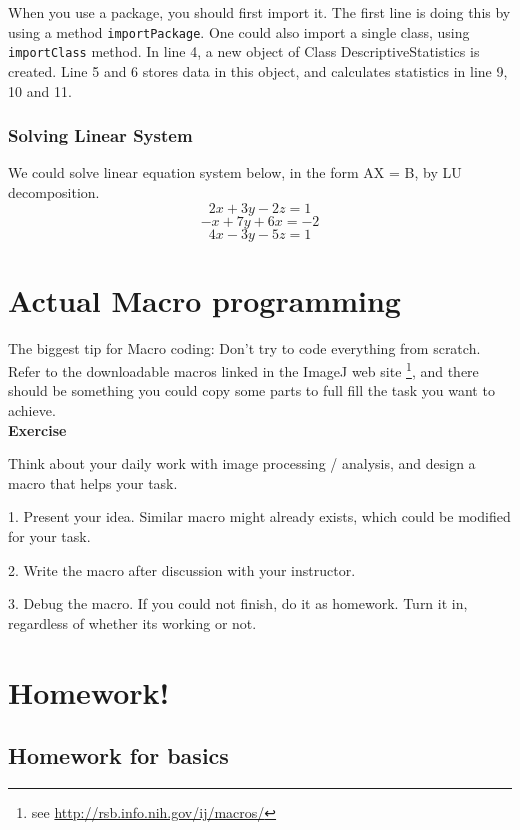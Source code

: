 \documentclass[11pt,a4paper,oneside]{report}
\newenvironment{indentexercise}[1]%
{{\setlength{\leftmargin}{2em}}%
\textbf{Exercise \thesubsection-#1}%
\begin{list}{}%
	\item%
}
{\end{list}}
\newcommand{\ilcom}[1]{\texttt{\small#1}}
\begin{document}


When you use a package, you should first import it. 
The first line is doing this by using a method \ilcom{importPackage}. 
One could also import a single class, using \ilcom{importClass} method. 
In line 4, a new object of Class DescriptiveStatistics is created. Line 5 and 6 stores data in this object, 
and calculates statistics in line 9, 10 and 11.

\subsubsection{Solving Linear System}
We could solve linear equation system below, in the form AX = B, by LU decomposition. 
\[
2x + 3y - 2z = 1
\]
\[
-x + 7y + 6x = -2
\]
\[
4x - 3y - 5z = 1         
\]



\newpage

\section{Actual Macro programming}
The biggest tip for Macro coding: Don't try to code everything from scratch. 
Refer to the downloadable macros linked in the ImageJ web site 
\footnote{ see \url{http://rsb.info.nih.gov/ij/macros/}}, 
and there should be something you could copy some parts to full fill the task you want to achieve.\\

\begin{indentexercise}{1}
Think about your daily work with image processing / analysis, and design a macro that helps your task. 
\item 1. Present your idea. Similar macro might already exists, which could be modified for your task.  
\item 2. Write the macro after discussion with your instructor. 
\item 3. Debug the macro. If you could not finish, do it as homework. 
Turn it in, regardless of whether its working or not. 
\end{indentexercise}

\newpage

\section{Homework!}

\subsection{Homework for basics} 
\end{document}
